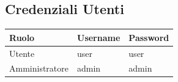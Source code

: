 \documentclass[a4paper, 12pt]{article}
\begin{document}
\begin{titlepage}
\section*{\centering Credenziali Utenti}
\begin{center}
\begin{longtable}{|l|l|l|}
\hline
\rowcolor[HTML]{094074}
{\color[HTML]{FFFFFF} Ruolo} & {\color[HTML]{FFFFFF} Username} & {\color[HTML]{FFFFFF} Password}\\
\hline
Utente & user & user\\
\hline
Amministratore & admin & admin\\
\hline
\end{longtable}
\end{center}
\end{titlepage}

\newpage
\tableofcontents
\end{document}
